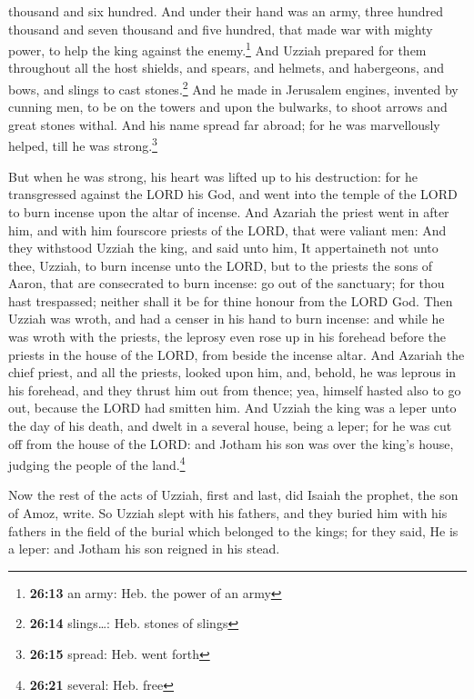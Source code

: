 thousand and six hundred.  And under their hand was an
army, three hundred thousand and seven thousand and five hundred, that
made war with mighty power, to help the king against the
enemy.\footnote{\textbf{26:13} an army: Heb. the power of an army}
 And Uzziah prepared for them throughout all the host
shields, and spears, and helmets, and habergeons, and bows, and slings
to cast stones.\footnote{\textbf{26:14} slings\ldots: Heb. stones of
  slings}  And he made in Jerusalem engines, invented by
cunning men, to be on the towers and upon the bulwarks, to shoot arrows
and great stones withal. And his name spread far abroad; for he was
marvellously helped, till he was strong.\footnote{\textbf{26:15} spread:
  Heb. went forth}

 But when he was strong, his heart was lifted up to his
destruction: for he transgressed against the LORD his God, and went into
the temple of the LORD to burn incense upon the altar of incense.
 And Azariah the priest went in after him, and with him
fourscore priests of the LORD, that were valiant men: 
And they withstood Uzziah the king, and said unto him, It appertaineth
not unto thee, Uzziah, to burn incense unto the LORD, but to the priests
the sons of Aaron, that are consecrated to burn incense: go out of the
sanctuary; for thou hast trespassed; neither shall it be for thine
honour from the LORD God.  Then Uzziah was wroth, and had
a censer in his hand to burn incense: and while he was wroth with the
priests, the leprosy even rose up in his forehead before the priests in
the house of the LORD, from beside the incense altar. 
And Azariah the chief priest, and all the priests, looked upon him, and,
behold, he was leprous in his forehead, and they thrust him out from
thence; yea, himself hasted also to go out, because the LORD had smitten
him.  And Uzziah the king was a leper unto the day of his
death, and dwelt in a several house, being a leper; for he was cut off
from the house of the LORD: and Jotham his son was over the king's
house, judging the people of the land.\footnote{\textbf{26:21} several:
  Heb. free}

 Now the rest of the acts of Uzziah, first and last, did
Isaiah the prophet, the son of Amoz, write.  So Uzziah
slept with his fathers, and they buried him with his fathers in the
field of the burial which belonged to the kings; for they said, He is a
leper: and Jotham his son reigned in his stead.

